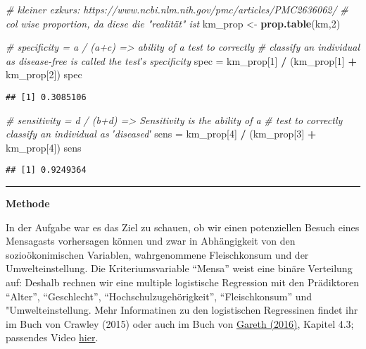 \documentclass[
]{article}
\newenvironment{Shaded}{\begin{snugshade}}{\end{snugshade}}
\newcommand{\CommentTok}[1]{\textcolor[rgb]{0.56,0.35,0.01}{\textit{#1}}}
\newcommand{\DecValTok}[1]{\textcolor[rgb]{0.00,0.00,0.81}{#1}}
\newcommand{\KeywordTok}[1]{\textcolor[rgb]{0.13,0.29,0.53}{\textbf{#1}}}
\newcommand{\NormalTok}[1]{#1}
\newcommand{\OperatorTok}[1]{\textcolor[rgb]{0.81,0.36,0.00}{\textbf{#1}}}
\newcommand{\StringTok}[1]{\textcolor[rgb]{0.31,0.60,0.02}{#1}}
\begin{document}
\begin{Shaded}
\begin{Highlighting}[]
\CommentTok{# kleiner exkurs: https://www.ncbi.nlm.nih.gov/pmc/articles/PMC2636062/}
\CommentTok{# col wise proportion, da diese die "realität" ist}
\NormalTok{km_prop <-}\StringTok{ }\KeywordTok{prop.table}\NormalTok{(km,}\DecValTok{2}\NormalTok{)}


\CommentTok{# specificity = a / (a+c) => ability of a test to correctly }
\CommentTok{# classify an individual as disease-free is called the test′s specificity}
\NormalTok{spec =}\StringTok{ }\NormalTok{km_prop[}\DecValTok{1}\NormalTok{] }\OperatorTok{/}\StringTok{ }\NormalTok{(km_prop[}\DecValTok{1}\NormalTok{] }\OperatorTok{+}\StringTok{ }\NormalTok{km_prop[}\DecValTok{2}\NormalTok{])}
\NormalTok{spec}
\end{Highlighting}
\end{Shaded}

\begin{verbatim}
## [1] 0.3085106
\end{verbatim}

\begin{Shaded}
\begin{Highlighting}[]
\CommentTok{# sensitivity = d / (b+d) => Sensitivity is the ability of a }
\CommentTok{# test to correctly classify an individual as ′diseased′}
\NormalTok{sens =}\StringTok{ }\NormalTok{km_prop[}\DecValTok{4}\NormalTok{] }\OperatorTok{/}\StringTok{ }\NormalTok{(km_prop[}\DecValTok{3}\NormalTok{] }\OperatorTok{+}\StringTok{ }\NormalTok{km_prop[}\DecValTok{4}\NormalTok{])}
\NormalTok{sens}
\end{Highlighting}
\end{Shaded}

\begin{verbatim}
## [1] 0.9249364
\end{verbatim}

\begin{center}\rule{0.5\linewidth}{0.5pt}\end{center}

\textbf{Methode}

In der Aufgabe war es das Ziel zu schauen, ob wir einen potenziellen
Besuch eines Mensagasts vorhersagen können und zwar in Abhängigkeit von
den sozioökonimischen Variablen, wahrgenommene Fleischkonsum und der
Umwelteinstellung. Die Kriteriumsvariable ``Mensa'' weist eine binäre
Verteilung auf: Deshalb rechnen wir eine multiple logistische Regression
mit den Prädiktoren ``Alter'', ``Geschlecht'',
``Hochschulzugehörigkeit'', ``Fleischkonsum'' und "Umwelteinstellung.
Mehr Informatinen zu den logistischen Regressinen findet ihr im Buch von
Crawley (2015) oder auch im Buch von
\href{http://faculty.marshall.usc.edu/gareth-james/ISL/ISLR\%20Seventh\%20Printing.pdf}{Gareth
(2016)}, Kapitel 4.3; passendes Video
\href{https://www.youtube.com/watch?v=31Q5FGRnxt4\&list=PL5-da3qGB5IC4vaDba5ClatUmFppXLAhE\&index=2}{hier}.
\end{document}
